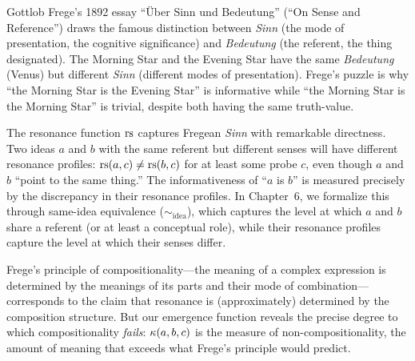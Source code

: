 \begin{interpretation}\label{interp:ch1:frege_sense_reference}
Gottlob Frege's 1892 essay ``\"{U}ber Sinn und Bedeutung'' (``On Sense and
Reference'') draws the famous distinction between \emph{Sinn} (the mode of
presentation, the cognitive significance) and \emph{Bedeutung} (the
referent, the thing designated). The Morning Star and the Evening Star have
the same \emph{Bedeutung} (Venus) but different \emph{Sinn} (different
modes of presentation). Frege's puzzle is why ``the Morning Star is the
Evening Star'' is informative while ``the Morning Star is the Morning Star''
is trivial, despite both having the same truth-value.

The resonance function $\mathrm{rs}$ captures Fregean \emph{Sinn} with remarkable
directness. Two ideas $a$ and $b$ with the same referent but different
senses will have different resonance profiles: $\mathrm{rs}(a, c) \neq \mathrm{rs}(b, c)$
for at least some probe $c$, even though $a$ and $b$ ``point to the same
thing.'' The informativeness of ``$a$ is $b$'' is measured precisely by
the discrepancy in their resonance profiles. In Chapter~6, we formalize
this through same-idea equivalence ($\sim_{\text{idea}}$), which captures
the level at which $a$ and $b$ share a referent (or at least a conceptual
role), while their resonance profiles capture the level at which their
senses differ.

Frege's principle of compositionality---the meaning of a complex expression
is determined by the meanings of its parts and their mode of
combination---corresponds to the claim that resonance is (approximately)
determined by the composition structure. But our emergence function reveals
the precise degree to which compositionality \emph{fails}: $\kappa(a,b,c)$
is the measure of non-compositionality, the amount of meaning that exceeds
what Frege's principle would predict.
\end{interpretation}

